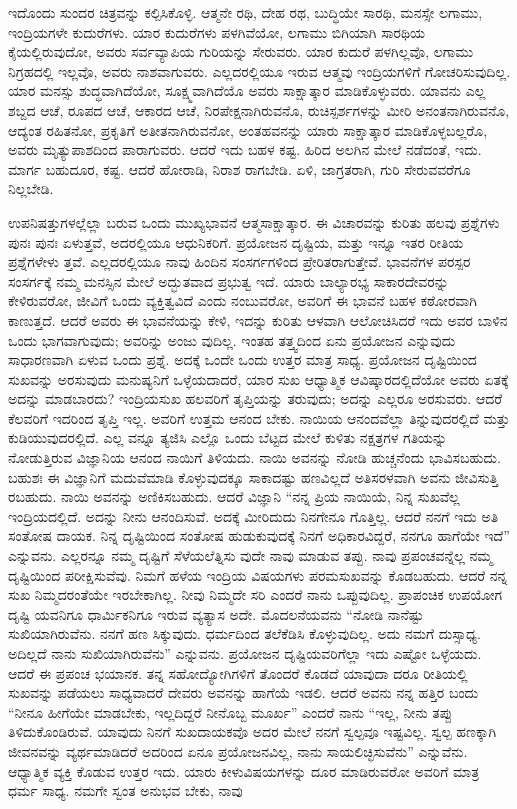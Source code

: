 ಇದೊಂದು ಸುಂದರ ಚಿತ್ರವನ್ನು ಕಲ್ಪಿಸಿಕೊಳ್ಳಿ. ಆತ್ಮನೇ ರಥಿ, ದೇಹ ರಥ, ಬುದ್ಧಿಯೇ ಸಾರಥಿ, ಮನಸ್ಸೇ ಲಗಾಮು, ಇಂದ್ರಿಯಗಳೇ ಕುದುರೆಗಳು. ಯಾರ ಕುದುರೆಗಳು ಪಳಗಿವೆಯೋ, ಲಗಾಮು ಬಿಗಿಯಾಗಿ ಸಾರಥಿಯ ಕೈಯಲ್ಲಿರುವುದೋ, ಅವರು ಸರ್ವವ್ಯಾಪಿಯ ಗುರಿಯನ್ನು ಸೇರುವರು. ಯಾರ ಕುದುರೆ ಪಳಗಿಲ್ಲವೊ, ಲಗಾಮು ನಿಗ್ರಹದಲ್ಲಿ ಇಲ್ಲವೊ, ಅವರು ನಾಶವಾಗುವರು. ಎಲ್ಲದರಲ್ಲಿಯೂ ಇರುವ ಆತ್ಮವು ಇಂದ್ರಿಯಗಳಿಗೆ ಗೋಚರಿಸುವುದಿಲ್ಲ. ಯಾರ ಮನಸ್ಸು ಶುದ್ಧವಾಗಿದೆಯೋ, ಸೂಕ್ಷ್ಮವಾಗಿದೆಯೊ ಅವರು ಸಾಕ್ಷಾತ್ಕಾರ ಮಾಡಿಕೊಳ್ಳುವರು. ಯಾವನು ಎಲ್ಲ ಶಬ್ದದ ಆಚೆ, ರೂಪದ ಆಚೆ, ಆಕಾರದ ಆಚೆ, ನಿರಪೇಕ್ಷನಾಗಿರುವನೊ, ರುಚಿಸ್ಪರ್ಶಗಳನ್ನು ಮೀರಿ ಅನಂತನಾಗಿರುವನೊ, ಆದ್ಯಂತ ರಹಿತನೋ, ಪ್ರಕೃತಿಗೆ ಅತೀತನಾಗಿರುವನೋ, ಅಂತಹವನನ್ನು ಯಾರು ಸಾಕ್ಷಾತ್ಕಾರ ಮಾಡಿಕೊಳ್ಳಬಲ್ಲರೊ, ಅವರು ಮೃತ್ಯುಪಾಶದಿಂದ ಪಾರಾಗುವರು. ಆದರೆ ಇದು ಬಹಳ ಕಷ್ಟ. ಹಿರಿದ ಅಲಗಿನ ಮೇಲೆ ನಡೆದಂತೆ, ಇದು. ಮಾರ್ಗ ಬಹುದೂರ, ಕಷ್ಟ. ಆದರೆ ಹೋರಾಡಿ, ನಿರಾಶ ರಾಗಬೇಡಿ. ಏಳಿ, ಜಾಗ್ರತರಾಗಿ, ಗುರಿ ಸೇರುವವರೆಗೂ ನಿಲ್ಲಬೇಡಿ.

ಉಪನಿಷತ್ತುಗಳಲ್ಲೆಲ್ಲಾ ಬರುವ ಒಂದು ಮುಖ್ಯಭಾವನೆ ಆತ್ಮಸಾಕ್ಷಾತ್ಕಾರ. ಈ ವಿಚಾರವನ್ನು ಕುರಿತು ಹಲವು ಪ್ರಶ್ನೆಗಳು ಪುನಃ ಪುನಃ ಏಳುತ್ತವೆ, ಅದರಲ್ಲಿಯೂ ಆಧುನಿಕರಿಗೆ. ಪ್ರಯೋಜನ ದೃಷ್ಟಿಯ, ಮತ್ತು ಇನ್ನೂ ಇತರ ರೀತಿಯ ಪ್ರಶ್ನೆಗಳೇಳು ತ್ತವೆ. ಎಲ್ಲದರಲ್ಲಿಯೂ ನಾವು ಹಿಂದಿನ ಸಂಸರ್ಗಗಳಿಂದ ಪ್ರೇರಿತರಾಗುತ್ತೇವೆ. ಭಾವನೆಗಳ ಪರಸ್ಪರ ಸಂಸರ್ಗಕ್ಕೆ ನಮ್ಮ ಮನಸ್ಸಿನ ಮೇಲೆ ಅದ್ಭುತವಾದ ಪ್ರಭುತ್ವ ಇದೆ. ಯಾರು ಬಾಲ್ಯಾರಭ್ಯ ಸಾಕಾರದೇವರನ್ನು ಕೇಳಿರುವರೋ, ಜೀವಿಗೆ ಒಂದು ವ್ಯಕ್ತಿತ್ವವಿದೆ ಎಂದು ನಂಬುವರೋ, ಅವರಿಗೆ ಈ ಭಾವನೆ ಬಹಳ ಕಠೋರವಾಗಿ ಕಾಣುತ್ತದೆ. ಆದರೆ ಅವರು ಈ ಭಾವನೆಯನ್ನು ಕೇಳಿ, ಇದನ್ನು ಕುರಿತು ಆಳವಾಗಿ ಆಲೋಚಿಸಿದರೆ ಇದು ಅವರ ಬಾಳಿನ ಒಂದು ಭಾಗವಾಗುವುದು; ಅವರಿನ್ನು ಅಂಜು ವುದಿಲ್ಲ. ಇಂತಹ ತತ್ತ್ವದಿಂದ ಏನು ಪ್ರಯೋಜನ ಎನ್ನುವುದು ಸಾಧಾರಣವಾಗಿ ಏಳುವ ಒಂದು ಪ್ರಶ್ನೆ. ಅದಕ್ಕೆ ಒಂದೇ ಒಂದು ಉತ್ತರ ಮಾತ್ರ ಸಾಧ್ಯ. ಪ್ರಯೋಜನ ದೃಷ್ಟಿಯಿಂದ ಸುಖವನ್ನು ಅರಸುವುದು ಮನುಷ್ಯನಿಗೆ ಒಳ್ಳೆಯದಾದರೆ, ಯಾರ ಸುಖ ಆಧ್ಯಾತ್ಮಿಕ ಆವಿಷ್ಕಾರದಲ್ಲಿದೆಯೋ ಅವರು ಏತಕ್ಕೆ ಅದನ್ನು ಮಾಡಬಾರದು? ಇಂದ್ರಿಯಸುಖ ಹಲವರಿಗೆ ತೃಪ್ತಿಯನ್ನು ತರುವುದು; ಅದನ್ನು ಎಲ್ಲರೂ ಅರಸುವರು. ಆದರೆ ಕೆಲವರಿಗೆ ಇದರಿಂದ ತೃಪ್ತಿ ಇಲ್ಲ. ಅವರಿಗೆ ಉತ್ತಮ ಆನಂದ ಬೇಕು. ನಾಯಿಯ ಆನಂದವೆಲ್ಲಾ ತಿನ್ನುವುದರಲ್ಲಿದೆ ಮತ್ತು ಕುಡಿಯುವುದರಲ್ಲಿದೆ. ಎಲ್ಲ ವನ್ನೂ ತ್ಯಜಿಸಿ ಎಲ್ಲೊ ಒಂದು ಬೆಟ್ಟದ ಮೇಲೆ ಕುಳಿತು ನಕ್ಷತ್ರಗಳ ಗತಿಯನ್ನು ನೋಡುತ್ತಿರುವ ವಿಜ್ಞಾನಿಯ ಆನಂದ ನಾಯಿಗೆ ತಿಳಿಯದು. ನಾಯಿ ಅವನನ್ನು ನೋಡಿ ಹುಚ್ಚನೆಂದು ಭಾವಿಸಬಹುದು. ಬಹುಶಃ ಈ ವಿಜ್ಞಾನಿಗೆ ಮದುವೆಮಾಡಿ ಕೊಳ್ಳುವುದಕ್ಕೂ ಸಾಕಾದಷ್ಟು ಹಣವಿಲ್ಲದೆ ಅತಿಸರಳವಾಗಿ ಅವನು ಜೀವಿಸುತ್ತಿ ರಬಹುದು. ನಾಯಿ ಅವನನ್ನು ಅಣಿಕಿಸಬಹುದು. ಆದರೆ ವಿಜ್ಞಾನಿ “ನನ್ನ ಪ್ರಿಯ ನಾಯಿಯೆ, ನಿನ್ನ ಸುಖವೆಲ್ಲ ಇಂದ್ರಿಯದಲ್ಲಿದೆ. ಅದನ್ನು ನೀನು ಆನಂದಿಸುವೆ. ಅದಕ್ಕೆ ಮೀರಿದುದು ನಿನಗೇನೂ ಗೊತ್ತಿಲ್ಲ. ಆದರೆ ನನಗೆ ಇದು ಅತಿ ಸಂತೋಷ ದಾಯಕ. ನಿನ್ನ ದೃಷ್ಟಿಯಿಂದ ಸಂತೋಷ ಹುಡುಕುವುದಕ್ಕೆ ನಿನಗೆ ಅಧಿಕಾರವಿದ್ದರೆ, ನನಗೂ ಹಾಗೆಯೇ ಇದೆ” ಎನ್ನುವನು. ಎಲ್ಲರನ್ನೂ ನಮ್ಮ ದೃಷ್ಟಿಗೆ ಸೆಳೆಯಲೆತ್ನಿಸು ವುದೇ ನಾವು ಮಾಡುವ ತಪ್ಪು. ನಾವು ಪ್ರಪಂಚವನ್ನೆಲ್ಲ ನಮ್ಮ ದೃಷ್ಟಿಯಿಂದ ಪರೀಕ್ಷಿಸುವೆವು. ನಿಮಗೆ ಹಳೆಯ ಇಂದ್ರಿಯ ವಿಷಯಗಳು ಪರಮಸುಖವನ್ನು ಕೊಡಬಹುದು. ಆದರೆ ನನ್ನ ಸುಖ ನಿಮ್ಮದರಂತೆಯೇ ಇರಬೇಕಾಗಿಲ್ಲ. ನೀವು ನಿಮ್ಮದೇ ಸರಿ ಎಂದರೆ ನಾನು ಒಪ್ಪುವುದಿಲ್ಲ. ಪ್ರಾಪಂಚಿಕ ಉಪಯೋಗ ದೃಷ್ಟಿ ಯವನಿಗೂ ಧಾರ್ಮಿಕನಿಗೂ ಇರುವ ವ್ಯತ್ಯಾಸ ಅದೇ. ಮೊದಲನೆಯವನು “ನೋಡಿ ನಾನೆಷ್ಟು ಸುಖಿಯಾಗಿರುವೆನು. ನನಗೆ ಹಣ ಸಿಕ್ಕುವುದು. ಧರ್ಮದಿಂದ ತಲೆಕೆಡಿಸಿ ಕೊಳ್ಳುವುದಿಲ್ಲ. ಅದು ನಮಗೆ ದುಸ್ಸಾಧ್ಯ. ಅದಿಲ್ಲದೆ ನಾನು ಸುಖಿಯಾಗಿರುವೆನು” ಎನ್ನುವನು. ಪ್ರಯೋಜನ ದೃಷ್ಟಿಯವರಿಗೆಲ್ಲಾ ಇದು ಎಷ್ಟೋ ಒಳ್ಳೆಯದು. ಆದರೆ ಈ ಪ್ರಪಂಚ ಭಯಾನಕ. ತನ್ನ ಸಹೋದ್ಯೋಗಿಗಳಿಗೆ ತೊಂದರೆ ಕೊಡದೆ ಯಾವುದಾ ದರೂ ರೀತಿಯಲ್ಲಿ ಸುಖವನ್ನು ಪಡೆಯಲು ಸಾಧ್ಯವಾದರೆ ದೇವರು ಅವನನ್ನು ಹಾಗೆಯೆ ಇಡಲಿ. ಆದರೆ ಅವನು ನನ್ನ ಹತ್ತಿರ ಬಂದು “ನೀನೂ ಹೀಗೆಯೇ ಮಾಡಬೇಕು, ಇಲ್ಲದಿದ್ದರೆ ನೀನೊಬ್ಬ ಮೂರ್ಖ” ಎಂದರೆ ನಾನು “ಇಲ್ಲ, ನೀನು ತಪ್ಪು ತಿಳಿದುಕೊಂಡಿರುವೆ. ಯಾವುದು ನಿನಗೆ ಸುಖದಾಯಕವೊ ಅದರ ಮೇಲೆ ನನಗೆ ಸ್ವಲ್ಪವೂ ಇಷ್ಟವಿಲ್ಲ. ಸ್ವಲ್ಪ ಹಣಕ್ಕಾಗಿ ಜೀವನವನ್ನು ವ್ಯರ್ಥಮಾಡಿದರೆ ಅದರಿಂದ ಏನೂ ಪ್ರಯೋಜನವಿಲ್ಲ, ನಾನು ಸಾಯಲಿಚ್ಛಿಸುವೆನು” ಎನ್ನುವೆನು. ಆಧ್ಯಾತ್ಮಿಕ ವ್ಯಕ್ತಿ ಕೊಡುವ ಉತ್ತರ ಇದು. ಯಾರು ಕೀಳುವಿಷಯಗಳನ್ನು ದೂರ ಮಾಡಿರುವರೋ ಅವರಿಗೆ ಮಾತ್ರ ಧರ್ಮ ಸಾಧ್ಯ. ನಮಗೇ ಸ್ವಂತ ಅನುಭವ ಬೇಕು, ನಾವು 